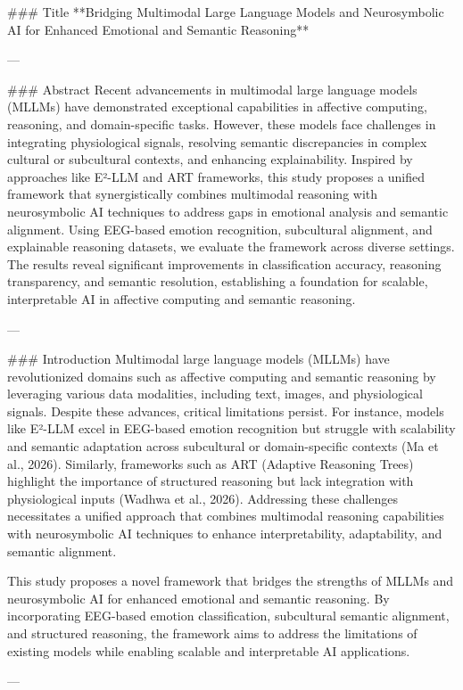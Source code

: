 ### Title  
**Bridging Multimodal Large Language Models and Neurosymbolic AI for Enhanced Emotional and Semantic Reasoning**

---

### Abstract  
Recent advancements in multimodal large language models (MLLMs) have demonstrated exceptional capabilities in affective computing, reasoning, and domain-specific tasks. However, these models face challenges in integrating physiological signals, resolving semantic discrepancies in complex cultural or subcultural contexts, and enhancing explainability. Inspired by approaches like E²-LLM and ART frameworks, this study proposes a unified framework that synergistically combines multimodal reasoning with neurosymbolic AI techniques to address gaps in emotional analysis and semantic alignment. Using EEG-based emotion recognition, subcultural alignment, and explainable reasoning datasets, we evaluate the framework across diverse settings. The results reveal significant improvements in classification accuracy, reasoning transparency, and semantic resolution, establishing a foundation for scalable, interpretable AI in affective computing and semantic reasoning.

---

### Introduction  
Multimodal large language models (MLLMs) have revolutionized domains such as affective computing and semantic reasoning by leveraging various data modalities, including text, images, and physiological signals. Despite these advances, critical limitations persist. For instance, models like E²-LLM excel in EEG-based emotion recognition but struggle with scalability and semantic adaptation across subcultural or domain-specific contexts (Ma et al., 2026). Similarly, frameworks such as ART (Adaptive Reasoning Trees) highlight the importance of structured reasoning but lack integration with physiological inputs (Wadhwa et al., 2026). Addressing these challenges necessitates a unified approach that combines multimodal reasoning capabilities with neurosymbolic AI techniques to enhance interpretability, adaptability, and semantic alignment.

This study proposes a novel framework that bridges the strengths of MLLMs and neurosymbolic AI for enhanced emotional and semantic reasoning. By incorporating EEG-based emotion classification, subcultural semantic alignment, and structured reasoning, the framework aims to address the limitations of existing models while enabling scalable and interpretable AI applications.

---

